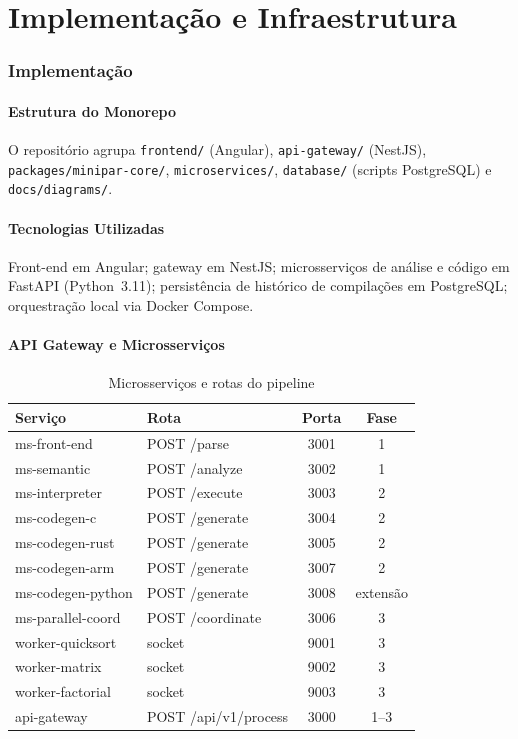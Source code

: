 \documentclass[12pt]{article}
\begin{document}
\part{Implementação e Infraestrutura}

\section{Implementação}
\subsection{Estrutura do Monorepo}
O repositório agrupa \texttt{frontend/} (Angular), \texttt{api-gateway/} (NestJS), \texttt{packages/minipar-core/}, \texttt{microservices/}, \texttt{database/} (scripts PostgreSQL) e \texttt{docs/diagrams/}.

\subsection{Tecnologias Utilizadas}
Front-end em Angular; gateway em NestJS; microsserviços de análise e código em FastAPI (Python~3.11); persistência de histórico de compilações em PostgreSQL; orquestração local via Docker Compose.

\subsection{API Gateway e Microsserviços}
\begin{table}[htbp]
\centering
\small
\caption{Microsserviços e rotas do pipeline}
\label{tab:microservices}
\begin{tabularx}{\textwidth}{|Y|l|c|c|}
\hline
\textbf{Serviço} & \textbf{Rota} & \textbf{Porta} & \textbf{Fase} \\
\hline
ms-front-end & POST /parse & 3001 & 1 \\
ms-semantic & POST /analyze & 3002 & 1 \\
ms-interpreter & POST /execute & 3003 & 2 \\
ms-codegen-c & POST /generate & 3004 & 2 \\
ms-codegen-rust & POST /generate & 3005 & 2 \\
ms-codegen-arm & POST /generate & 3007 & 2 \\
ms-codegen-python & POST /generate & 3008 & extensão \\
ms-parallel-coord & POST /coordinate & 3006 & 3 \\
worker-quicksort & socket & 9001 & 3 \\
worker-matrix & socket & 9002 & 3 \\
worker-factorial & socket & 9003 & 3 \\
api-gateway & POST /api/v1/process & 3000 & 1--3 \\
\hline
\end{tabularx}
\end{table}
\end{document}
